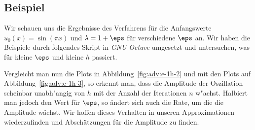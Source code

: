 \subsection{Beispiel}

Wir schauen uns die Ergebnisse des Verfahrens für die Anfangswerte $u_0(x) = \sin(\pi x)$ und $\lambda = 1 + \eps$ für verschiedene $\eps$ an.
Wir haben die Beispiele durch folgendes Skript in \emph{GNU Octave} umgesetzt und untersuchen, was für kleine $\eps$ und kleine $h$ passiert.

% 


Vergleicht man nun die Plots in Abbildung~\ref{fig:adv:e-1h-2} und mit den Plots auf Abbildung~\ref{fig:adv:e-1h-3}, so erkennt man, dass die Amplitude der Oszillation scheinbar unabh"angig von $h$ mit der Anzahl der Iterationen $n$ w"achst.
Halbiert man jedoch den Wert für $\eps$, so ändert sich auch die Rate, um die die Amplitude wächst.
Wir hoffen dieses Verhalten in unseren Approximationen wiederzufinden und Abschätzungen für die Amplitude zu finden.